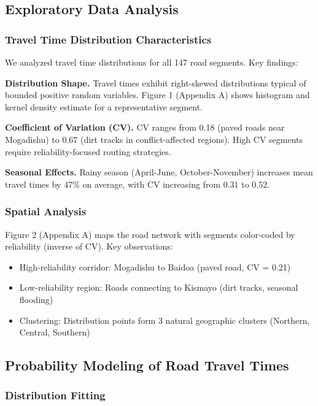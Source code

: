 \subsection{Exploratory Data Analysis}

\subsubsection{Travel Time Distribution Characteristics}

We analyzed travel time distributions for all 147 road segments. Key findings:

\textbf{Distribution Shape.} Travel times exhibit right-skewed distributions typical of bounded positive random variables. Figure 1 (Appendix A) shows histogram and kernel density estimate for a representative segment.

\textbf{Coefficient of Variation (CV).} CV ranges from 0.18 (paved roads near Mogadishu) to 0.67 (dirt tracks in conflict-affected regions). High CV segments require reliability-focused routing strategies.

\textbf{Seasonal Effects.} Rainy season (April-June, October-November) increases mean travel times by 47\% on average, with CV increasing from 0.31 to 0.52.

\subsubsection{Spatial Analysis}

Figure 2 (Appendix A) maps the road network with segments color-coded by reliability (inverse of CV). Key observations:
\begin{itemize}
\item High-reliability corridor: Mogadishu to Baidoa (paved road, CV = 0.21)
\item Low-reliability region: Roads connecting to Kismayo (dirt tracks, seasonal flooding)
\item Clustering: Distribution points form 3 natural geographic clusters (Northern, Central, Southern)
\end{itemize}

\subsection{Probability Modeling of Road Travel Times}

\subsubsection{Distribution Fitting}

